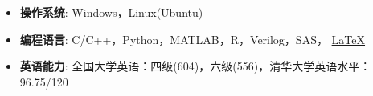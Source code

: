   \begin{itemize}[leftmargin=*]
    \item \textbf{操作系统}: Windows，Linux(Ubuntu)

    \item \textbf{编程语言}: C/C++，Python，MATLAB，R，Verilog，SAS，
    \href{http://www.latex-project.org/}{\LaTeX}

    \item \textbf{英语能力}: 全国大学英语：四级(604)，六级(556)，清华大学英语水平：96.75/120
  \end{itemize}